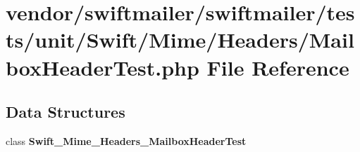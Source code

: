 \section{vendor/swiftmailer/swiftmailer/tests/unit/\+Swift/\+Mime/\+Headers/\+Mailbox\+Header\+Test.php File Reference}
\label{_mailbox_header_test_8php}
\subsection*{Data Structures}
\begin{DoxyCompactItemize}
\item 
class {\bf Swift\+\_\+\+Mime\+\_\+\+Headers\+\_\+\+Mailbox\+Header\+Test}
\end{DoxyCompactItemize}
